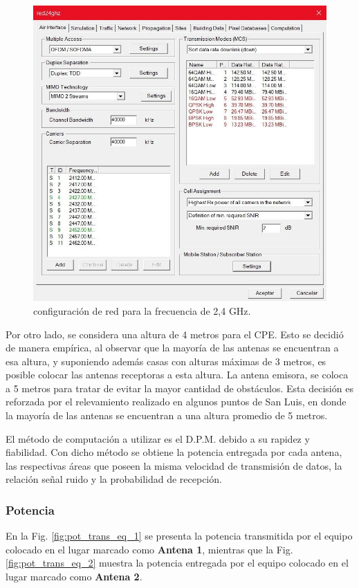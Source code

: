 \documentclass[11pt,a4paper]{article}
\begin{document}
\begin{figure}[htbp]
  \centering
  \includegraphics[width=0.5\linewidth]{fotos_ema/conf_red_2_4.jpg}
  \caption{configuración de red para la frecuencia de 2,4 GHz.}
  \label{fig:conf_red_2_4}
\end{figure}

Por otro lado, se considera una altura de 4 metros para el CPE. 
Esto se decidió de manera empírica, al observar que la mayoría de las antenas se encuentran a esa altura, y suponiendo además casas con alturas máximas de 3 metros, es posible colocar las antenas receptoras a esta altura. 
La antena emisora, se coloca a 5 metros para tratar de evitar la mayor cantidad de obstáculos. 
Esta decisión es reforzada por el relevamiento realizado en algunos puntos de San Luis, en donde la mayoría de las antenas se encuentran a una altura promedio de 5 metros.

El método de computación a utilizar es el D.P.M. debido a su rapidez y fiabilidad. 
Con dicho método se obtiene la potencia entregada por cada antena, las respectivas áreas que poseen la misma velocidad de transmisión de datos, la relación señal ruido y la probabilidad de recepción. 

\subsubsection{Potencia}

En la Fig. \ref{fig:pot_trans_eq_1} se presenta la potencia transmitida por el equipo colocado en el lugar marcado como \textbf{Antena 1}, mientras que la Fig. \ref{fig:pot_trans_eq_2} muestra la potencia entregada por el equipo colocado en el lugar marcado como \textbf{Antena 2}.
\end{document}
